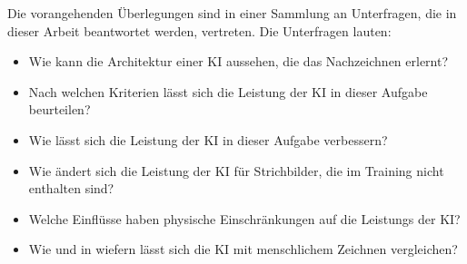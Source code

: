 Die vorangehenden Überlegungen sind in einer Sammlung an Unterfragen, die in
dieser Arbeit beantwortet werden, vertreten. Die Unterfragen lauten:
\begin{itemize}
    \item Wie kann die Architektur einer KI aussehen, die das Nachzeichnen erlernt?
    \item Nach welchen Kriterien lässt sich die Leistung der KI in dieser Aufgabe beurteilen?
    \item Wie lässt sich die Leistung der KI in dieser Aufgabe verbessern?
    \item Wie ändert sich die Leistung der KI für Strichbilder, die im Training nicht enthalten sind?
    \item Welche Einflüsse haben physische Einschränkungen auf die Leistungs der KI?
    \item Wie und in wiefern lässt sich die KI mit menschlichem Zeichnen vergleichen?
\end{itemize}


